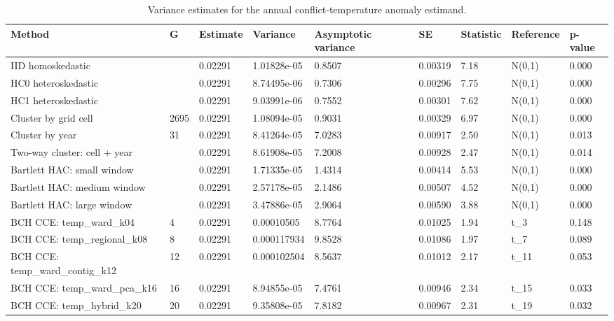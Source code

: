 \begin{table}

\caption{\label{tab:tab:bch-application-variance}Variance estimates for the annual conflict-temperature anomaly estimand.}
\centering
\begin{tabular}[t]{lllllllll}
\toprule
Method & G & Estimate & Variance & Asymptotic variance & SE & Statistic & Reference & p-value\\
\midrule
IID homoskedastic &  & 0.02291 & 1.01828e-05 & 0.8507 & 0.00319 & 7.18 & N(0,1) & 0.000\\
HC0 heteroskedastic &  & 0.02291 & 8.74495e-06 & 0.7306 & 0.00296 & 7.75 & N(0,1) & 0.000\\
HC1 heteroskedastic &  & 0.02291 & 9.03991e-06 & 0.7552 & 0.00301 & 7.62 & N(0,1) & 0.000\\
Cluster by grid cell & 2695 & 0.02291 & 1.08094e-05 & 0.9031 & 0.00329 & 6.97 & N(0,1) & 0.000\\
Cluster by year & 31 & 0.02291 & 8.41264e-05 & 7.0283 & 0.00917 & 2.50 & N(0,1) & 0.013\\
\addlinespace
Two-way cluster: cell + year &  & 0.02291 & 8.61908e-05 & 7.2008 & 0.00928 & 2.47 & N(0,1) & 0.014\\
Bartlett HAC: small window &  & 0.02291 & 1.71335e-05 & 1.4314 & 0.00414 & 5.53 & N(0,1) & 0.000\\
Bartlett HAC: medium window &  & 0.02291 & 2.57178e-05 & 2.1486 & 0.00507 & 4.52 & N(0,1) & 0.000\\
Bartlett HAC: large window &  & 0.02291 & 3.47886e-05 & 2.9064 & 0.00590 & 3.88 & N(0,1) & 0.000\\
BCH CCE: temp\_ward\_k04 & 4 & 0.02291 & 0.00010505 & 8.7764 & 0.01025 & 1.94 & t\_3 & 0.148\\
\addlinespace
BCH CCE: temp\_regional\_k08 & 8 & 0.02291 & 0.000117934 & 9.8528 & 0.01086 & 1.97 & t\_7 & 0.089\\
BCH CCE: temp\_ward\_contig\_k12 & 12 & 0.02291 & 0.000102504 & 8.5637 & 0.01012 & 2.17 & t\_11 & 0.053\\
BCH CCE: temp\_ward\_pca\_k16 & 16 & 0.02291 & 8.94855e-05 & 7.4761 & 0.00946 & 2.34 & t\_15 & 0.033\\
BCH CCE: temp\_hybrid\_k20 & 20 & 0.02291 & 9.35808e-05 & 7.8182 & 0.00967 & 2.31 & t\_19 & 0.032\\
\bottomrule
\end{tabular}
\end{table}
